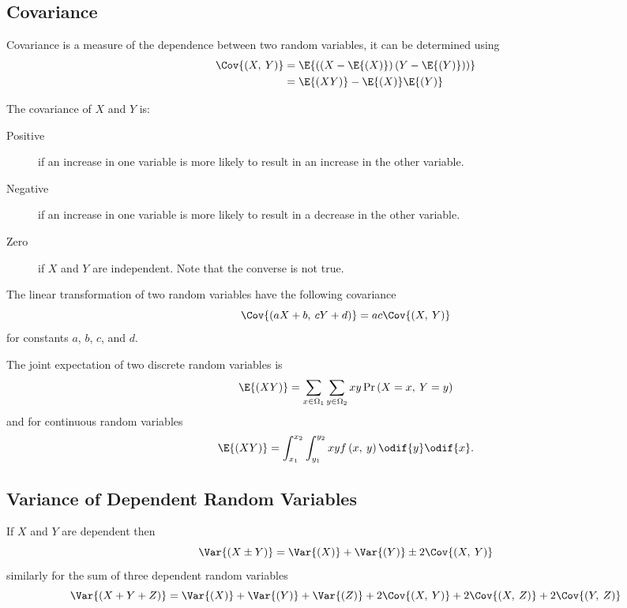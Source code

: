 \documentclass{article}
\begin{document}
\subsection{Covariance}
\begin{definition}[Covariance]
    Covariance is a measure of the dependence between two random variables, it can be determined using
    \begin{align*}
        \Cov{\left( X,\: Y \right)} & = \E{\left( \left( X - \E{\left( X \right)} \right) \left( Y - \E{\left( Y \right)} \right) \right)} \\
                                    & = \E{\left( XY \right)} - \E{\left( X \right)} \E{\left( Y \right)}
    \end{align*}
\end{definition}
The covariance of \(X\) and \(Y\) is:
\begin{description}
    \item[Positive] if an increase in one variable is more likely to result in an increase in
        the other variable.
    \item[Negative] if an increase in one variable is more likely to result in a decrease in
        the other variable.
    \item[Zero] if \(X\) and \(Y\) are independent. Note that the converse is not true.
\end{description}
The linear transformation of two random variables have the following covariance
\begin{equation*}
    \Cov{\left( aX + b,\: cY + d \right)} = ac \Cov{\left( X,\: Y \right)}
\end{equation*}
for constants \(a\), \(b\), \(c\), and \(d\).
\begin{definition}
    The joint expectation of two discrete random variables is
    \begin{equation*}
        \E{\left( XY \right)} = \sum_{x\in\Omega_1} \sum_{y\in\Omega_2} xy \Pr{\left( X = x,\: Y = y \right)}
    \end{equation*}
    and for continuous random variables
    \begin{equation*}
        \E{\left( XY \right)} = \int_{x_1}^{x_2} \int_{y_1}^{y_2} xy f\left( x,\: y \right) \odif{y} \odif{x}.
    \end{equation*}
\end{definition}
\subsection{Variance of Dependent Random Variables}
If \(X\) and \(Y\) are dependent then
\begin{equation*}
    \Var{\left( X \pm Y \right)} = \Var{\left( X \right)} + \Var{\left( Y \right)} \pm 2\Cov{\left( X,\: Y \right)}
\end{equation*}
similarly for the sum of three dependent random variables
\begin{equation*}
    \Var{\left( X + Y + Z \right)} = \Var{\left( X \right)} + \Var{\left( Y \right)} + \Var{\left( Z \right)} + 2\Cov{\left( X,\: Y \right)} + 2\Cov{\left( X,\: Z \right)} + 2\Cov{\left( Y,\: Z \right)}
\end{equation*}
\end{document}
